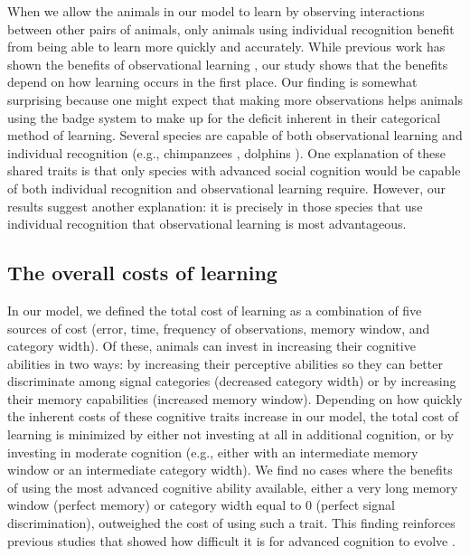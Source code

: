 When we allow the animals in our model to learn by observing interactions between other pairs of animals, only animals using individual recognition benefit from being able to learn more quickly and accurately. While previous work has shown the benefits of observational learning \citep{Freeman:1985kl,Holekamp:1991nx,Schaik:2011oq}, our study shows that the benefits depend on how learning occurs in the first place. Our finding is somewhat surprising because one might expect that making more observations helps animals using the badge system to make up for the deficit inherent in their categorical method of learning. Several species are capable of both observational learning and individual recognition (e.g., chimpanzees \citep{Parr:2000hc,Hopper:2008bh}, dolphins \citep{Sayigh:1999bs,Krutzen:2005ij}). One explanation of these shared traits is that only species with advanced social cognition would be capable of both individual recognition and observational learning require. However, our results suggest another explanation: it is precisely in those species that use individual recognition that observational learning is most advantageous.

\subsection*{The overall costs of learning} %
In our model, we defined the total cost of learning as a combination of five sources of cost (error, time, frequency of observations, memory window, and category width). Of these, animals can invest in increasing their cognitive abilities in two ways: by increasing their perceptive abilities so they can better discriminate among signal categories (decreased category width) or by increasing their memory capabilities (increased memory window). Depending on how quickly the inherent costs of these cognitive traits increase in our model, the total cost of learning is minimized by either not investing at all in additional cognition, or by investing in moderate cognition (e.g., either with an intermediate memory window or an intermediate category width). We find no cases where the benefits of using the most advanced cognitive ability available, either a very long memory window (perfect memory) or category width equal to $0$ (perfect signal discrimination), outweighed the cost of using such a trait. This finding reinforces previous studies that showed how difficult it is for advanced cognition to evolve \citep{Kerr:2003vn}.


